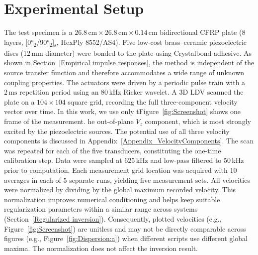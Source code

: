 \documentclass[a4paper,fleqn]{cas-sc}
\begin{document}
\section{Experimental Setup}\label{Sec:Exp}
The test specimen is a $26.8\,\mathrm{cm} \times 26.8\,\mathrm{cm} \times 0.14\,\mathrm{cm}$ bidirectional CFRP plate (8 layers, [0°\textsubscript{2}/90°\textsubscript{2}]\textsubscript{s}, HexPly 8552/AS4). Five low-cost brass--ceramic piezoelectric discs (12\,mm diameter) were bonded to the plate using Crystalbond adhesive. As shown in Section~\ref{Empirical impulse responses}, the method is independent of the source transfer function and therefore accommodates a wide range of unknown coupling properties.
The actuators were driven by a periodic pulse train with a $2\,\mathrm{ms}$ repetition period using an 80\,kHz Ricker wavelet. A 3D LDV scanned the plate on a $104\times104$ square grid, recording the full three-component velocity vector over time. In this work, we use only tFigure~\ref{fig:Screenshot} shows one frame of the measurement. he out-of-plane $V_z$ component, which is most strongly excited by the piezoelectric sources. The potential use of all three velocity components is discussed in Appendix~\ref{Appendix_VelocityComponents}.
The scan was repeated for each of the five transducers, constituting the one-time calibration step. Data were sampled at $625\,\mathrm{kHz}$ and low-pass filtered to 50\,kHz prior to computation. Each measurement grid location was acquired with 10 averages in each of 5 separate runs, yielding five measurement sets. All velocities were normalized by dividing by the global maximum recorded velocity. This normalization improves numerical conditioning and helps keep suitable regularization parameters within a similar range across systems (Section~\ref{Regularized inversion}). Consequently, plotted velocities (e.g., Figure~\ref{fig:Screenshot}) are unitless and may not be directly comparable across figures (e.g., Figure~\ref{fig:Dispersion:a}) when different scripts use different global maxima. The normalization does not affect the inversion result.
\end{document}
